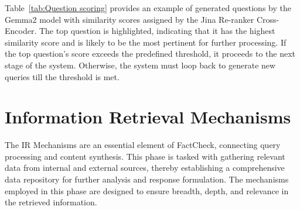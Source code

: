 \begin{table}[h!]
    \noindent
    \caption{Example of generated questions by the Gemma2 model with relevance scores assigned by the Jina Re-ranker Cross-Encoder.}
    \label{tab:Question scoring}
\end{table}

Table~\ref{tab:Question scoring} provides an example of generated questions by the Gemma2 model with similarity scores assigned by the Jina Re-ranker Cross-Encoder.
The top question is highlighted, indicating that it has the highest similarity score and is likely to be the most pertinent for further processing.
If the top question's score exceeds the predefined threshold, it proceeds to the next stage of the system.
Otherwise, the system must loop back to generate new queries till the threshold is met.

\section{Information Retrieval Mechanisms}\label{sec:information-retrieval-mechanisms}
The \ac{IR} Mechanisms are an essential element of FactCheck, connecting query processing and content synthesis.
This phase is tasked with gathering relevant data from internal and external sources, thereby establishing a comprehensive data repository for further analysis and response formulation.
The mechanisms employed in this phase are designed to ensure breadth, depth, and relevance in the retrieved information.

